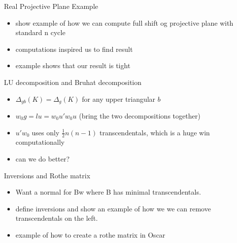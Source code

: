 \documentclass[9pt]{beamer}
\theoremstyle{definition}
\begin{document}

\begin{frame}[fragile]{Real Projective Plane Example}
  \begin{itemize}
  \item show example of how we can compute full shift og projective plane with standard n cycle
  \item computations inspired us to find result
  \item example shows that our result is tight
  \end{itemize}
\end{frame}



\begin{frame}[fragile]{LU decomposition and Bruhat decomposition }
  \begin{itemize}
  \item $\Delta_{gb}(K) = \Delta_g(K)$ for any upper triangular $b$
  \item $w_0g = lu = w_0u'w_0u$ (bring the two decompositions together)
  \item $u'w_0$ uses only $\frac{1}{2}n(n-1)$ transcendentals, which is a huge win computationally
  \item can we do better?
  \end{itemize}
\end{frame}


\begin{frame}[fragile]{Inversions and Rothe matrix}
  \begin{itemize}
  \item Want a normal for Bw where B has minimal transcendentals.
  \item define inversions and show an example of how we we can remove transcendentals on the left.
  \item example of how to create a rothe matrix in Oscar
  \end{itemize}
\end{frame}
\end{document}
